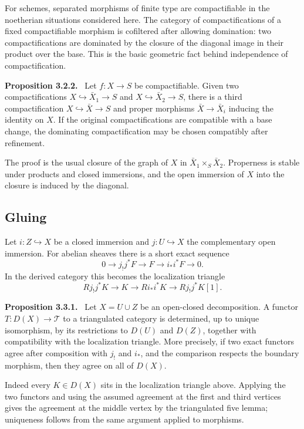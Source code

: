 \documentclass[12pt]{article}
\newenvironment{statement}[1]{\par\medskip\noindent\textbf{#1.}\ }{\par\medskip}
\begin{document}
For schemes, separated morphisms of finite type are compactifiable in the noetherian situations considered here. The category of compactifications of a fixed compactifiable morphism is cofiltered after allowing domination: two compactifications are dominated by the closure of the diagonal image in their product over the base. This is the basic geometric fact behind independence of compactification.

\begin{statement}{Proposition 3.2.2}
Let \(f:X\to S\) be compactifiable. Given two compactifications \(X\hookrightarrow\bar X_1\to S\) and \(X\hookrightarrow\bar X_2\to S\), there is a third compactification \(X\hookrightarrow\bar X\to S\) and proper morphisms \(\bar X\to\bar X_i\) inducing the identity on \(X\). If the original compactifications are compatible with a base change, the dominating compactification may be chosen compatibly after refinement.
\end{statement}

The proof is the usual closure of the graph of \(X\) in \(\bar X_1\times_S\bar X_2\). Properness is stable under products and closed immersions, and the open immersion of \(X\) into the closure is induced by the diagonal.

\subsection{Gluing}

Let \(i:Z\hookrightarrow X\) be a closed immersion and \(j:U\hookrightarrow X\) the complementary open immersion. For abelian sheaves there is a short exact sequence
\[
0\to j_!j^*F\to F\to i_*i^*F\to0.
\]
In the derived category this becomes the localization triangle
\[
Rj_!j^*K\to K\to Ri_*i^*K\to Rj_!j^*K[1].
\]

\begin{statement}{Proposition 3.3.1}
Let \(X=U\cup Z\) be an open-closed decomposition. A functor \(T:D(X)\to\mathcal T\) to a triangulated category is determined, up to unique isomorphism, by its restrictions to \(D(U)\) and \(D(Z)\), together with compatibility with the localization triangle. More precisely, if two exact functors agree after composition with \(j_!\) and \(i_*\), and the comparison respects the boundary morphism, then they agree on all of \(D(X)\).
\end{statement}

Indeed every \(K\in D(X)\) sits in the localization triangle above. Applying the two functors and using the assumed agreement at the first and third vertices gives the agreement at the middle vertex by the triangulated five lemma; uniqueness follows from the same argument applied to morphisms.
\end{document}

